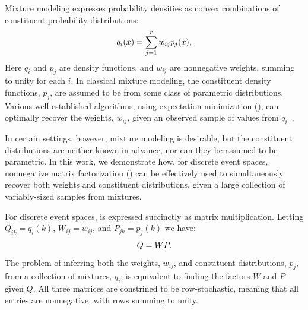 \documentclass[conference]{IEEEtran}
\title{\vspace{-0.25em}\thetitle}
\author{
{\large{Stefan~Karpinski, John~R.~Gilbert, Elizabeth~M.~Belding}} \vspace{0.25em}\\
Department of Computer Science \\
University of California, Santa Barbara \vspace{0.35em}\\
\textit{\{sgk,gilbert,ebelding\}@cs.ucsb.edu}
}
\begin{document}
\maketitle

Mixture modeling expresses probability densities as convex combinations of constituent probability distributions:
\begin{align}\eqn{mixture-model}
  q_i(x) = \sum_{j=1}^r w_{ij} p_j(x),
\end{align}
Here $q_i$ and $p_j$ are density functions, and $w_{ij}$ are nonnegative weights, summing to unity for each $i$.
In classical mixture modeling, the constituent density functions, $p_j$, are assumed to be from some class of parametric distributions.
Various well established algorithms, using expectation minimization (), can optimally recover the weights, $w_{ij}$, given an observed sample of values from $q_i$~\cite{MMEM}.

In certain settings, however, mixture modeling is desirable, but the constituent distributions are neither known in advance, nor can they be assumed to be parametric.
In this work, we demonstrate how, for discrete event spaces, nonnegative matrix factorization () can be effectively used to simultaneously recover both weights and constituent distributions, given a large collection of variably-sized samples from mixtures.

For discrete event spaces,  is expressed succinctly as matrix multiplication.
Letting $Q_{ik} = q_i(k)$, $W_{ij} = w_{ij}$, and $P_{jk} = p_j(k)$ we have:
\begin{align}\eqn{mixture-model-matrix}
  Q = WP.
\end{align}
The problem of inferring both the weights, $w_{ij}$, and constituent distributions, $p_j$, from a collection of mixtures, $q_i$, is equivalent to finding the factors $W$ and $P$ given $Q$.
All three matrices are constrined to be row-stochastic, meaning that all entries are nonnegative, with rows summing to unity.
\end{document}
